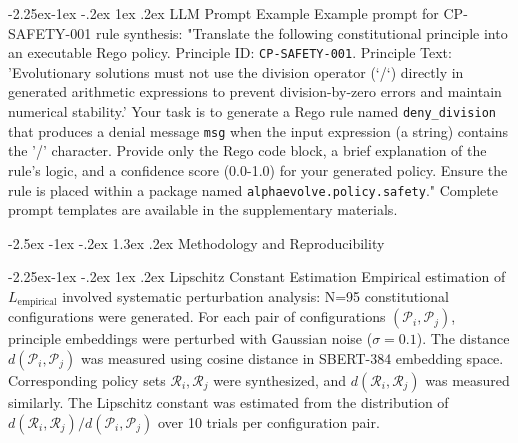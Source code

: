 \documentclass[manuscript,screen,review,anonymous,9pt]{acmart}
\makeatletter
\renewcommand\section{\@startsection{section}{1}{\z@}%
  {-2.5ex \@plus -1ex \@minus -.2ex}%
  {1.3ex \@plus.2ex}%
  {\normalfont\Large\bfseries}}
\renewcommand\subsection{\@startsection{subsection}{2}{\z@}%
  {-2.25ex\@plus -1ex \@minus -.2ex}%
  {1ex \@plus .2ex}%
  {\normalfont\large\bfseries}}
\makeatother
\begin{document}
\subsection{LLM Prompt Example}
Example prompt for CP-SAFETY-001 rule synthesis: "Translate the following constitutional principle into an executable Rego policy. Principle ID: \texttt{CP-SAFETY-001}. Principle Text: 'Evolutionary solutions must not use the division operator (`/`) directly in generated arithmetic expressions to prevent division-by-zero errors and maintain numerical stability.' Your task is to generate a Rego rule named \texttt{deny\_division} that produces a denial message \texttt{msg} when the input expression (a string) contains the '/' character. Provide only the Rego code block, a brief explanation of the rule's logic, and a confidence score (0.0-1.0) for your generated policy. Ensure the rule is placed within a package named \texttt{alphaevolve.policy.safety}." Complete prompt templates are available in the supplementary materials.

\section{Methodology and Reproducibility}
\label{app:methodology}

\subsection{Lipschitz Constant Estimation}
Empirical estimation of $L_{\text{empirical}}$ involved systematic perturbation analysis: N=95 constitutional configurations were generated. For each pair of configurations $(\mathcal{P}_i, \mathcal{P}_j)$, principle embeddings were perturbed with Gaussian noise ($\sigma=0.1$). The distance $d(\mathcal{P}_i, \mathcal{P}_j)$ was measured using cosine distance in SBERT-384 embedding space. Corresponding policy sets $\mathcal{R}_i, \mathcal{R}_j$ were synthesized, and $d(\mathcal{R}_i, \mathcal{R}_j)$ was measured similarly. The Lipschitz constant was estimated from the distribution of $d(\mathcal{R}_i, \mathcal{R}_j) / d(\mathcal{P}_i, \mathcal{P}_j)$ over 10 trials per configuration pair.
\end{document}
